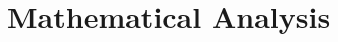 \documentclass[11pt,reqno, a4]{amsart}
\begin{document}
    
    
\section{Mathematical Analysis}
\end{document}
